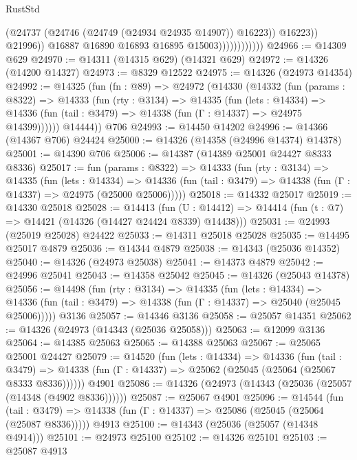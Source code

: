 \begin{lexlean}{RustStd}
\begin{coremodule}
                                    (@24737 (@24746 (@24749 (@24934 @24935 @14907)) @16223))
                                    @16223))
                                @21996))
                            @16887
                            @16890
                            @16893
                            @16895
                            @15003))))))))))))
@24966 := @14309 @629
@24970 := @14311 (@14315 @629) (@14321 @629)
@24972 := @14326 (@14200 @14327)
@24973 := @8329 @12522
@24975 := @14326 (@24973 @14354)
@24992 := @14325
    (fun (fn : @89) =>
    @24972
      (@14330
        (@14332
          (fun (params : @8322) =>
          @14333
            (fun (rty : @3134) =>
            @14335
              (fun (lets : @14334) =>
              @14336 (fun (tail : @3479) => @14338 (fun (Γ : @14337) => @24975 @14399))))))
        @14444))
    @706
@24993 := @14450 @14202
@24996 := @14366 (@14367 @706) @24424
@25000 := @14326 (@14358 (@24996 @14374) @14378)
@25001 := @14390 @706
@25006 := @14387 (@14389 @25001 @24427 @8333 @8336)
@25017 := fun (params : @8322) =>
  @14333
    (fun (rty : @3134) =>
    @14335
      (fun (lets : @14334) =>
      @14336 (fun (tail : @3479) => @14338 (fun (Γ : @14337) => @24975 (@25000 @25006)))))
@25018 := @14332 @25017
@25019 := @14330 @25018
@25028 := @14413
    (fun (U : @14412) => @14414 (fun (t : @7) => @14421 (@14326 (@14427 @24424 @8339) @14438)))
@25031 := @24993 (@25019 @25028) @24422
@25033 := @14311 @25018 @25028
@25035 := @14495 @25017 @4879
@25036 := @14344 @4879
@25038 := @14343 (@25036 @14352)
@25040 := @14326 (@24973 @25038)
@25041 := @14373 @4879
@25042 := @24996 @25041
@25043 := @14358 @25042
@25045 := @14326 (@25043 @14378)
@25056 := @14498
    (fun (rty : @3134) =>
    @14335
      (fun (lets : @14334) =>
      @14336 (fun (tail : @3479) => @14338 (fun (Γ : @14337) => @25040 (@25045 @25006)))))
    @3136
@25057 := @14346 @3136
@25058 := @25057 @14351
@25062 := @14326 (@24973 (@14343 (@25036 @25058)))
@25063 := @12099 @3136
@25064 := @14385 @25063
@25065 := @14388 @25063
@25067 := @25065 @25001 @24427
@25079 := @14520
    (fun (lets : @14334) =>
    @14336
      (fun (tail : @3479) =>
      @14338 (fun (Γ : @14337) => @25062 (@25045 (@25064 (@25067 @8333 @8336))))))
    @4901
@25086 := @14326 (@24973 (@14343 (@25036 (@25057 (@14348 (@4902 @8336))))))
@25087 := @25067 @4901
@25096 := @14544
    (fun (tail : @3479) => @14338 (fun (Γ : @14337) => @25086 (@25045 (@25064 (@25087 @8336)))))
    @4913
@25100 := @14343 (@25036 (@25057 (@14348 @4914)))
@25101 := @24973 @25100
@25102 := @14326 @25101
@25103 := @25087 @4913

\end{coremodule}
\end{lexlean}
